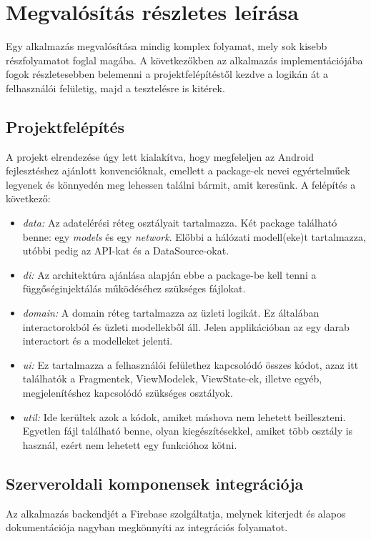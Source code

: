 \chapter{Megvalósítás részletes leírása}

Egy alkalmazás megvalósítása mindig komplex folyamat, mely sok kisebb részfolyamatot foglal magába. A következőkben az alkalmazás implementációjába fogok részletesebben belemenni a projektfelépítéstől kezdve a logikán át a felhasználói felületig, majd a tesztelésre is kitérek.

\section{Projektfelépítés}
A projekt elrendezése úgy lett kialakítva, hogy megfeleljen az Android fejlesztéshez ajánlott konvencióknak, emellett a package-ek nevei egyértelműek legyenek és könnyedén meg lehessen találni bármit, amit keresünk. A felépítés a következő:
\begin{itemize}
	\item \emph{data:} Az adatelérési réteg osztályait tartalmazza. Két package található benne: egy \emph{models} és egy \emph{network}. Előbbi a hálózati modell(eke)t tartalmazza, utóbbi pedig az API-kat és a DataSource-okat.
	\item \emph{di:} Az architektúra ajánlása alapján ebbe a package-be kell tenni a függőséginjektálás működéséhez szükséges fájlokat.
	\item \emph{domain:} A domain réteg tartalmazza az üzleti logikát. Ez általában interactorokból és üzleti modellekből áll. Jelen applikációban az egy darab interactort és a modelleket jelenti.
	\item \emph{ui:} Ez tartalmazza a felhasználói felülethez kapcsolódó összes kódot, azaz itt találhatók a Fragmentek, ViewModelek, ViewState-ek, illetve egyéb, megjelenítéshez kapcsolódó szükséges osztályok.
	\item \emph{util:} Ide kerültek azok a kódok, amiket máshova nem lehetett beilleszteni. Egyetlen fájl található benne, olyan kiegészítésekkel, amiket több osztály is használ, ezért nem lehetett egy funkcióhoz kötni.
\end{itemize}

\section{Szerveroldali komponensek integrációja}
Az alkalmazás backendjét a Firebase szolgáltatja, melynek kiterjedt és alapos dokumentációja nagyban megkönnyíti az integrációs folyamatot.

